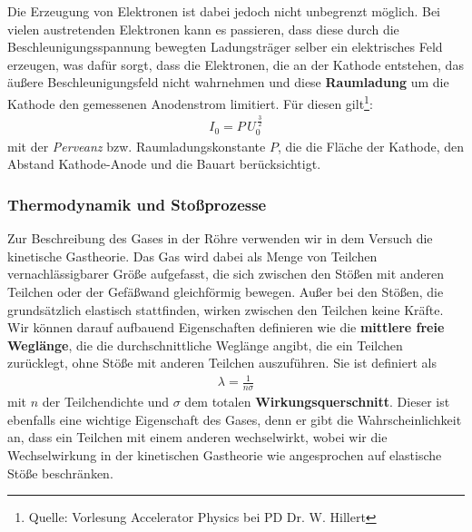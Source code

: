 \documentclass[11pt, a4paper]{article}
\begin{document}
Die Erzeugung von Elektronen ist dabei jedoch nicht unbegrenzt möglich.
Bei vielen austretenden Elektronen kann es passieren, dass diese durch die Beschleunigungsspannung bewegten Ladungsträger selber ein elektrisches Feld erzeugen, was dafür sorgt, dass die Elektronen, die an der Kathode entstehen, das äußere Beschleunigungsfeld nicht wahrnehmen und diese \textbf{Raumladung} um die Kathode den gemessenen Anodenstrom limitiert.
Für diesen gilt\footnote{Quelle: Vorlesung Accelerator Physics bei PD Dr. W. Hillert}:
\begin{align}
I_0=P\,U_0^{\,\frac{3}{2}}
\end{align}
mit der \emph{Perveanz} bzw. Raumladungskonstante $P$, die die Fläche der Kathode, den Abstand Kathode-Anode und die Bauart berücksichtigt.

\subsubsection{Thermodynamik und Stoßprozesse}

Zur Beschreibung des Gases in der Röhre verwenden wir in dem Versuch die kinetische Gastheorie.
Das Gas wird dabei als Menge von Teilchen vernachlässigbarer Größe aufgefasst, die sich zwischen den Stößen mit anderen Teilchen oder der Gefäßwand gleichförmig bewegen.
Außer bei den Stößen, die grundsätzlich elastisch stattfinden, wirken zwischen den Teilchen keine Kräfte.
Wir können darauf aufbauend Eigenschaften definieren wie die \textbf{mittlere freie Weglänge}, die die durchschnittliche Weglänge angibt, die ein Teilchen zurücklegt, ohne Stöße mit anderen Teilchen auszuführen.
Sie ist definiert als
\begin{align}
\lambda=\frac{1}{n\sigma}
\end{align}
mit $n$ der Teilchendichte und $\sigma$ dem totalen \textbf{Wirkungsquerschnitt}.
Dieser ist ebenfalls eine wichtige Eigenschaft des Gases, denn er gibt die Wahrscheinlichkeit an, dass ein Teilchen mit einem anderen wechselwirkt, wobei wir die Wechselwirkung in der kinetischen Gastheorie wie angesprochen auf elastische Stöße beschränken.
\end{document}
